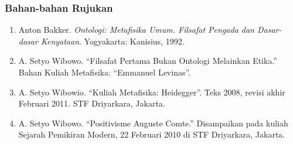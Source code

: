 \documentclass[10pt,a4paper]{article}
\def\tightlist{}
\begin{document}
\begin{multicols}{2}
\hypertarget{bahan-bahan-rujukan-3}{%
\subsubsection{Bahan-bahan Rujukan}\label{bahan-bahan-rujukan-3}}

\begin{enumerate}
\def\labelenumi{\arabic{enumi}.}
\tightlist
\item
  Anton Bakker. \emph{Ontologi: Metafisika Umum. Filsafat Pengada dan
  Dasar-dasar Kenyataan}. Yogyakarta: Kanisius, 1992.
\item
  A. Setyo Wibowo. ``Filsafat Pertama Bukan Ontologi Melainkan Etika.''
  Bahan Kuliah Metafisika: ``Emmanuel Levinas''.
\item
  A. Setyo Wibowio. ``Kuliah Metafisika: Heidegger''. Teks 2008, revisi
  akhir Februari 2011. STF Driyarkara, Jakarta.
\item
  A. Setyo Wibowo. ``Positivisme Auguste Comte.'' Disampaikan pada
  kuliah Sejarah Pemikiran Modern, 22 Februari 2010 di STF Driyarkara,
  Jakarta.
\end{enumerate}
\end{multicols}
\end{document}
